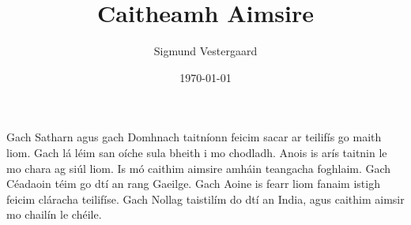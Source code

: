 \documentclass[article,a4paper,oneside,12pt]{memoir}
\title{\textbf{Caitheamh Aimsire}}
\author{Sigmund Vestergaard}
\date{\today}
\begin{document}
\maketitle

Gach Satharn agus gach Domhnach taitníonn feicim sacar ar teilifís go maith
liom. Gach lá l\'{e}im san oíche sula bheith i mo chodladh. Anois is arís
taitnin le mo chara ag siúl liom. Is mó caithim aimsire amháin teangacha
foghlaim. Gach C\'{e}adaoin t\'{e}im go dtí an rang Gaeilge. Gach Aoine is
fearr liom fanaim istigh feicim cláracha teilifíse. Gach Nollag taistilím do dtí
an India, agus caithim aimsir mo chailín le ch\'{e}ile.
\end{document}
